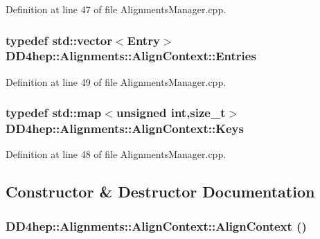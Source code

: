 Definition at line 47 of file AlignmentsManager.cpp.\hypertarget{class_d_d4hep_1_1_alignments_1_1_align_context_a1b5a088a6d88177089055193c11aa67c}{
\subsubsection[{Entries}]{\setlength{\rightskip}{0pt plus 5cm}typedef std::vector$<${\bf Entry}$>$ {\bf DD4hep::Alignments::AlignContext::Entries}}}
\label{class_d_d4hep_1_1_alignments_1_1_align_context_a1b5a088a6d88177089055193c11aa67c}


Definition at line 49 of file AlignmentsManager.cpp.\hypertarget{class_d_d4hep_1_1_alignments_1_1_align_context_afed2b1b68f90bb0129bd51a08904332b}{
\subsubsection[{Keys}]{\setlength{\rightskip}{0pt plus 5cm}typedef std::map$<$unsigned int,size\_\-t$>$ {\bf DD4hep::Alignments::AlignContext::Keys}}}
\label{class_d_d4hep_1_1_alignments_1_1_align_context_afed2b1b68f90bb0129bd51a08904332b}


Definition at line 48 of file AlignmentsManager.cpp.

\subsection{Constructor \& Destructor Documentation}
\hypertarget{class_d_d4hep_1_1_alignments_1_1_align_context_a0340e8218e8b1ffc12521b5d17bcdb90}{
\subsubsection[{AlignContext}]{\setlength{\rightskip}{0pt plus 5cm}DD4hep::Alignments::AlignContext::AlignContext ()}}
\label{class_d_d4hep_1_1_alignments_1_1_align_context_a0340e8218e8b1ffc12521b5d17bcdb90}


